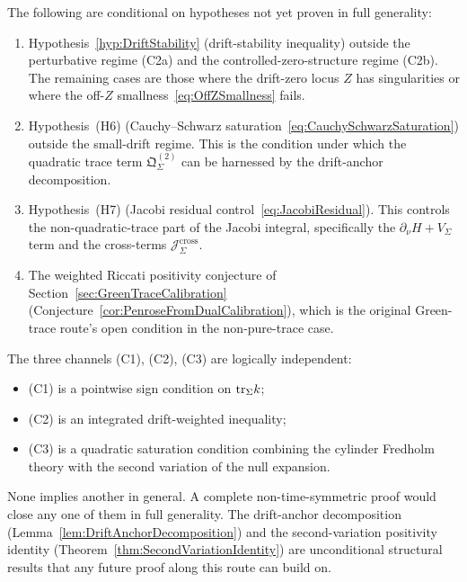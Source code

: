 \begin{remark}\label{rem:ConditionalResults}
The following are conditional on hypotheses not yet proven in full generality:
\begin{enumerate}
    \item Hypothesis~\ref{hyp:DriftStability} (drift-stability inequality) outside the perturbative regime (C2a) and the controlled-zero-structure regime (C2b). The remaining cases are those where the drift-zero locus $Z$ has singularities or where the off-$Z$ smallness~\eqref{eq:OffZSmallness} fails.
    \item Hypothesis~\textup{(H6)} (Cauchy--Schwarz saturation~\eqref{eq:CauchySchwarzSaturation}) outside the small-drift regime. This is the condition under which the quadratic trace term $\mathfrak Q_\Sigma^{(2)}$ can be harnessed by the drift-anchor decomposition.
    \item Hypothesis~\textup{(H7)} (Jacobi residual control~\eqref{eq:JacobiResidual}). This controls the non-quadratic-trace part of the Jacobi integral, specifically the $\partial_\nu H + V_\Sigma$ term and the cross-terms $\mathcal J_\Sigma^{\mathrm{cross}}$.
    \item The weighted Riccati positivity conjecture of Section~\ref{sec:GreenTraceCalibration} (Conjecture~\ref{cor:PenroseFromDualCalibration}), which is the original Green-trace route's open condition in the non-pure-trace case.
\end{enumerate}
\end{remark}

\begin{remark}\label{rem:LogicalIndependence}
The three channels (C1), (C2), (C3) are logically independent:
\begin{itemize}
    \item (C1) is a pointwise sign condition on $\mathrm{tr}_\Sigma k$;
    \item (C2) is an integrated drift-weighted inequality;
    \item (C3) is a quadratic saturation condition combining the cylinder Fredholm theory with the second variation of the null expansion.
\end{itemize}
None implies another in general. A complete non-time-symmetric proof would close any one of them in full generality. The drift-anchor decomposition (Lemma~\ref{lem:DriftAnchorDecomposition}) and the second-variation positivity identity (Theorem~\ref{thm:SecondVariationIdentity}) are unconditional structural results that any future proof along this route can build on.
\end{remark}

